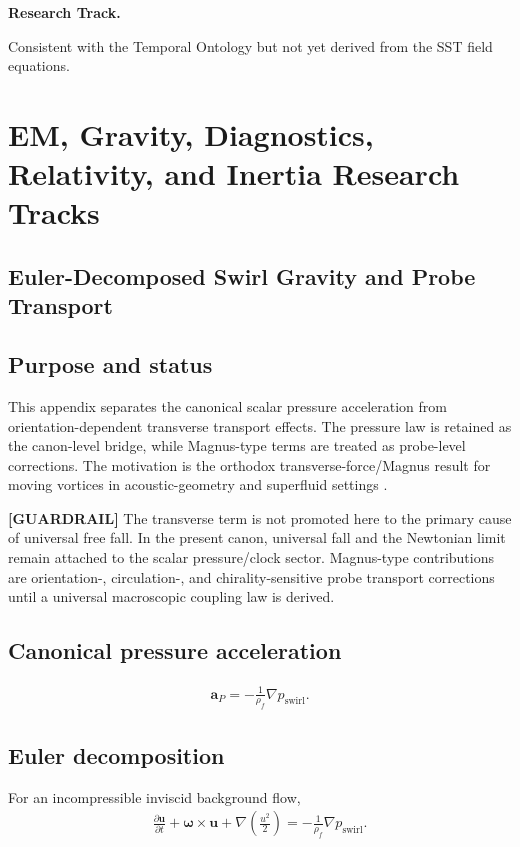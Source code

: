         \textbf{Research Track.}
        
        Consistent with the Temporal Ontology but not yet derived from the SST field
        equations.

\section{EM, Gravity, Diagnostics, Relativity, and Inertia Research Tracks}

\subsection{Euler-Decomposed Swirl Gravity and Probe Transport}
\label{sec:appendix_euler_probe_transport}

\subsection{Purpose and status}
    This appendix separates the canonical scalar pressure acceleration from
    orientation-dependent transverse transport effects. The pressure law is retained
    as the canon-level bridge, while Magnus-type terms are treated as probe-level
    corrections. The motivation is the orthodox transverse-force/Magnus result for
    moving vortices in acoustic-geometry and superfluid settings
    \cite{Zhang2005TransverseForce,Saffman1992}.

    \textbf{[GUARDRAIL]} The transverse term is not promoted here to the primary
    cause of universal free fall. In the present canon, universal fall and the
    Newtonian limit remain attached to the scalar pressure/clock sector. Magnus-type
    contributions are orientation-, circulation-, and chirality-sensitive probe
    transport corrections until a universal macroscopic coupling law is derived.

\subsection{Canonical pressure acceleration}
    \begin{align}
        \mathbf{a}_{P}
        =
        -\frac{1}{\rho_{\!f}}\nabla p_{\mathrm{swirl}}.
        \label{eq:rt_scalar_pressure_acceleration}
    \end{align}

\subsection{Euler decomposition}
    For an incompressible inviscid background flow,
    \begin{align}
        \frac{\partial \mathbf{u}}{\partial t}
        +
        \boldsymbol{\omega}\times\mathbf{u}
        +
        \nabla\left(\frac{u^2}{2}\right)
        =
        -\frac{1}{\rho_{\!f}}\nabla p_{\mathrm{swirl}}.
        \label{eq:rt_euler_decomposed_swirl_balance}
    \end{align}

